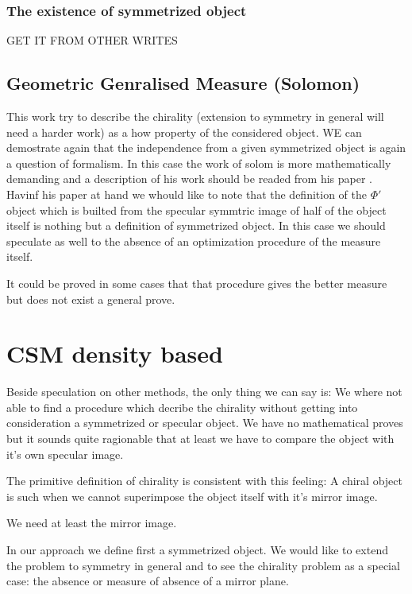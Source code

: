 \documentclass[a4paper,12pt]{article}
\begin{document}
\subsubsection{The existence of symmetrized object}

GET IT FROM OTHER WRITES

\subsection{Geometric Genralised Measure (Solomon)}

This work try to describe the chirality (extension to symmetry in general
will need a harder work) as a how property of the considered object.
WE can demostrate again that the independence from a given symmetrized object
is again a question of formalism. In this case the work of solom is more
mathematically demanding and a description of his work should be readed
from his paper \cite{solomon:chirality}.
Havinf his paper at hand we whould like to note that the definition of
the $\Phi'$ object which is builted from the specular symmtric image
of half of the object itself is nothing but a definition of symmetrized
object. In this case we should speculate as well to the absence of an
optimization procedure of the measure itself.

It could be proved in some cases that that procedure gives the better
measure but does not exist a general prove.

\section{CSM density based}

Beside speculation on other methods, the only thing we can say is: We where
not able to find a procedure which decribe the chirality without getting
into consideration a symmetrized or specular object. We have no mathematical
proves but it sounds quite ragionable that at least we have to compare
the object with it's own specular image.

The primitive definition of chirality is consistent with this feeling:
A chiral object is such when we cannot superimpose the object itself with
it's mirror image.

We need at least the mirror image.

In our approach we define first a symmetrized object. We would like to
extend the problem to symmetry in general and to see the chirality problem
as a special case: the absence or measure of absence of a mirror plane.
\end{document}
